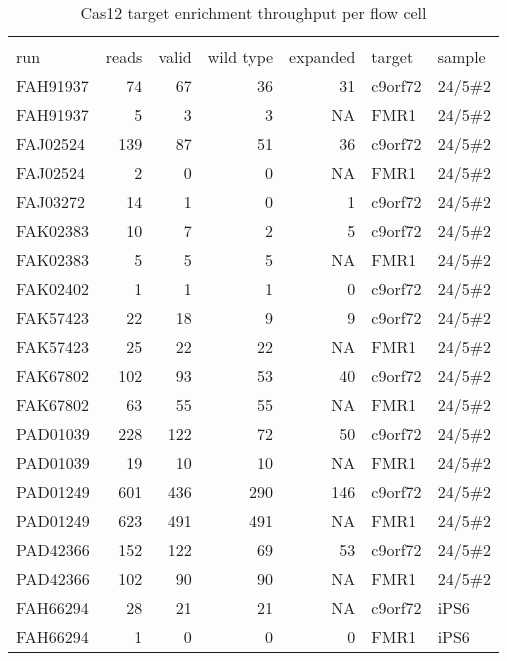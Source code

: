 \setlength\LTleft{0pt}
\setlength\LTright{0pt}
\begin{longtable}{lrrrrll}
\caption[Cas12 target enrichment throughput per flow cell]{Cas12 target enrichment throughput per flow cell} \\
\label{tab:strique:Cas12} \\
run      & reads & valid & wild type & expanded & target  & sample  \\
\hline
FAH91937 & 74    & 67    & 36        & 31       & c9orf72 & 24/5\#2 \\
FAH91937 & 5     & 3     & 3         & NA       & FMR1    & 24/5\#2 \\
FAJ02524 & 139   & 87    & 51        & 36       & c9orf72 & 24/5\#2 \\
FAJ02524 & 2     & 0     & 0         & NA       & FMR1    & 24/5\#2 \\
FAJ03272 & 14    & 1     & 0         & 1        & c9orf72 & 24/5\#2 \\
FAK02383 & 10    & 7     & 2         & 5        & c9orf72 & 24/5\#2 \\
FAK02383 & 5     & 5     & 5         & NA       & FMR1    & 24/5\#2 \\
FAK02402 & 1     & 1     & 1         & 0        & c9orf72 & 24/5\#2 \\
FAK57423 & 22    & 18    & 9         & 9        & c9orf72 & 24/5\#2 \\
FAK57423 & 25    & 22    & 22        & NA       & FMR1    & 24/5\#2 \\
FAK67802 & 102   & 93    & 53        & 40       & c9orf72 & 24/5\#2 \\
FAK67802 & 63    & 55    & 55        & NA       & FMR1    & 24/5\#2 \\
PAD01039 & 228   & 122   & 72        & 50       & c9orf72 & 24/5\#2 \\
PAD01039 & 19    & 10    & 10        & NA       & FMR1    & 24/5\#2 \\
PAD01249 & 601   & 436   & 290       & 146      & c9orf72 & 24/5\#2 \\
PAD01249 & 623   & 491   & 491       & NA       & FMR1    & 24/5\#2 \\
PAD42366 & 152   & 122   & 69        & 53       & c9orf72 & 24/5\#2 \\
PAD42366 & 102   & 90    & 90        & NA       & FMR1    & 24/5\#2 \\
FAH66294 & 28    & 21    & 21        & NA       & c9orf72 & iPS6    \\
FAH66294 & 1     & 0     & 0         & 0        & FMR1    & iPS6    \\

\end{longtable}
